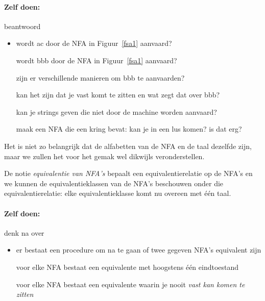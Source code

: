 \paragraph{Zelf doen:} beantwoord

\begin{itemize}
\item[]
wordt ac door de NFA in Figuur~\ref{fsa1} aanvaard?

wordt bbb door de NFA in Figuur~\ref{fsa1} aanvaard?

zijn er verschillende manieren om bbb te aanvaarden?

kan het zijn dat je vast komt te zitten en wat zegt dat over bbb?

kan je strings geven die niet door de machine worden aanvaard?

maak een NFA die een kring bevat: kan je in een lus komen? is dat erg?

\end{itemize}



Het is niet zo belangrijk dat de alfabetten van de NFA en de taal
dezelfde zijn, maar we zullen het voor het gemak wel dikwijls
veronderstellen.


De notie {\em equivalentie van NFA's} bepaalt een equivalentierelatie
op de NFA's en we kunnen de equivalentieklassen van de NFA's beschouwen
onder die equivalentierelatie: elke equivalentieklasse komt nu
overeen met \'{e}\'{e}n taal.


\paragraph{Zelf doen:} denk na over

\begin{itemize}
\item[] er bestaat een procedure om na te gaan of twee gegeven NFA's
equivalent zijn

voor elke NFA bestaat een equivalente met hoogstens \'{e}\'{e}n
eindtoestand

voor elke NFA bestaat een equivalente waarin je nooit {\em vast
kan komen te zitten}
\end{itemize}


